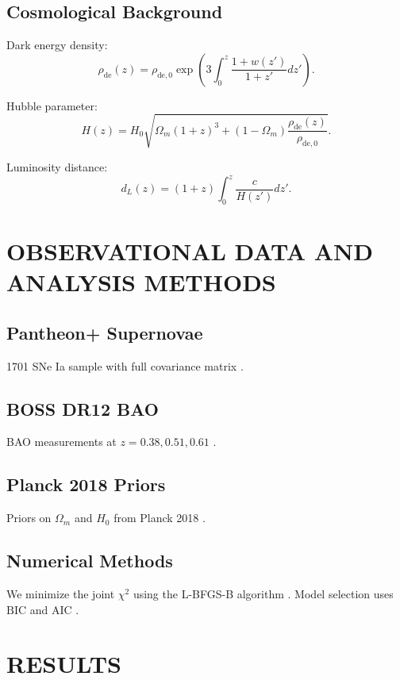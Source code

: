 \documentclass[10pt,twocolumn]{article}
\def\Om{\Omega_m}
\def\Hz{H_0}
\def\BIC{\text{BIC}}
\def\AIC{\text{AIC}}
\begin{document}
\subsection{Cosmological Background}
Dark energy density:
\begin{equation}
\rho_{\text{de}}(z) = \rho_{\text{de},0} \exp\left( 3 \int_0^z \frac{1 + w(z')}{1 + z'} dz' \right).
\end{equation}

Hubble parameter:
\begin{equation}
H(z) = \Hz \sqrt{\Om (1+z)^3 + (1 - \Om) \frac{\rho_{\text{de}}(z)}{\rho_{\text{de},0}}}.
\end{equation}

Luminosity distance:
\begin{equation}
d_L(z) = (1 + z) \int_0^z \frac{c}{H(z')} dz'.
\end{equation}

\section{OBSERVATIONAL DATA AND ANALYSIS METHODS}
\subsection{Pantheon+ Supernovae}
1701 SNe Ia sample with full covariance matrix \cite{scolnic2022}.

\subsection{BOSS DR12 BAO}
BAO measurements at $z=0.38, 0.51, 0.61$ \cite{alam2017}.

\subsection{Planck 2018 Priors}
Priors on $\Omega_m$ and $H_0$ from Planck 2018 \cite{planck2020}.

\subsection{Numerical Methods}
We minimize the joint $\chi^2$ using the L-BFGS-B algorithm \cite{byrd1995}. Model selection uses $\BIC$ and $\AIC$ \cite{kass1995}.

\section{RESULTS}
\end{document}

